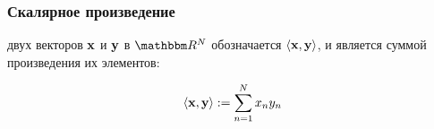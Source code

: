 


\begin{frame}
    \frametitle{Скалярное произведение}
    
     \vspace{2em}
     двух векторов ${\mathbf x}$ и ${\mathbf y}$ в $\RR^N$ обозначается $\left\langle{ {\mathbf x} ,   {\mathbf y} }\right\rangle$, и является суммой произведения их элементов:
    
    \vspace{.7em}
    \begin{equation*}
        \label{eq:dipv}
        \left\langle{ {\mathbf x} ,   {\mathbf y} }\right\rangle := \sum_{n=1}^N x_n y_n 
    \end{equation*}
    
    
\end{frame}







    

